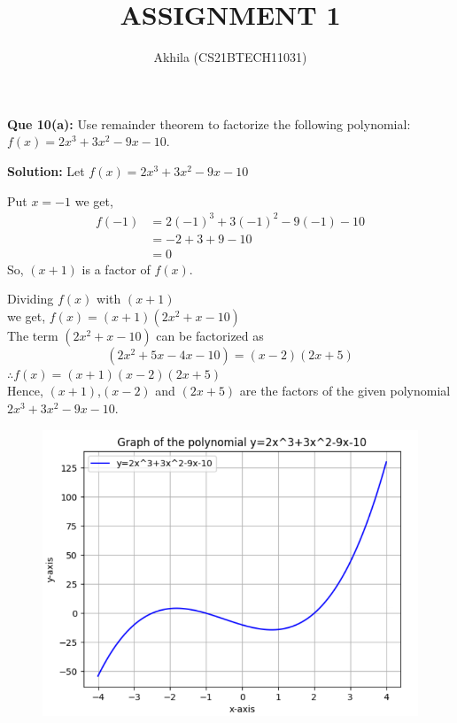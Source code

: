 \documentclass[12pt]{article}
\begin{document}
\large \title{ASSIGNMENT 1}
\author{Akhila (CS21BTECH11031)}
\maketitle
{\Large \textbf  {Que 10(a): }}
Use remainder theorem to factorize the following polynomial:\\
$f(x)=2x^3+3x^2-9x-10$.\\
\vspace{2mm}

{\Large \textbf  {Solution:}}
Let $f(x)=2x^3+3x^2-9x-10$ 

Put $x=-1$ we get,
\begin{align*}
f(-1) & =2(-1)^3+3(-1)^2-9(-1)-10\\
      & =-2+3+9-10\\ 
      & =0
\end{align*}
So, $(x+1)$ is a factor of $f(x)$.

Dividing $f(x)$ with $(x+1)$\\ 
 we get,
        $f(x)=(x+1)(2x^2+x-10)$\\
The term $(2x^2+x-10)$ can be factorized as
\begin{equation*}
    (2x^2+5x-4x-10)=(x-2)(2x+5)
\end{equation*}
\vspace{5mm}
$\therefore f(x)=(x+1)(x-2)(2x+5)$\\
Hence,  $(x+1)$,$(x-2)$ and $(2x+5)$  are the factors of the given polynomial\\
$2x^3+3x^2-9x-10$.
\begin{figure}
    \centering
    \includegraphics[scale=0.8]{plot.png}
\end{figure}
\end{document}
